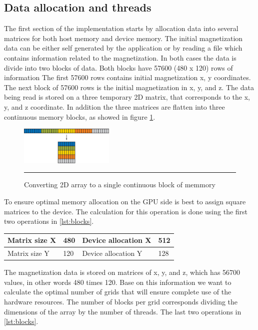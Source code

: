 \subsection{Data allocation and threads}

The first section of the implementation starts by allocation data into several matrices for both host memory and device memory. The initial magnetization data can be either self generated by the application or by reading a file which contains information related to the magnetization. In both cases the data is divide into two blocks of data. Both blocks have 57600 (480 x 120) rows of information The first 57600 rows contains initial magnetization x, y coordinates. The next block of 57600 rows is the initial magnetization in x, y, and z. The data being read is stored on a three temporary 2D matrix, that corresponds to the x, y, and z coordinate. In addition the three matrices are flatten into three continuous memory blocks, as showed in figure \ref{fig:flaten}.


\begin{figure}[htbp]
	\centering
		\includegraphics[width=0.4\textwidth]{Figures/flaten.png}
		\rule{35em}{0.2pt}
	\caption[2D Flatten array]{Converting 2D array to a single continuous block of memmory}
	\label{fig:flaten}
\end{figure}


To ensure optimal memory allocation on the GPU side is best to assign square matrices to the device. The calculation for this operation is done using the first two operations in \ref{lst:blocks}.

\begin{table}[h]
\centering
\begin{tabular}{| l | l | l | l | }
\hline
Matrix size X & 480 & Device allocation X & 512\\
\hline
Matrix size Y & 120 & Device allocation Y & 128 \\
\hline
\end{tabular}
\end{table}

The magnetization data is stored on matrices of x, y, and z, which has 56700 values, in other words 480 times 120. Base on this information we want to calculate the optimal number of grids that will ensure complete use of the hardware resources. The number of blocks per grid corresponds dividing  the dimensions of the array by the number of threads. The last two operations in \ref{lst:blocks}.

